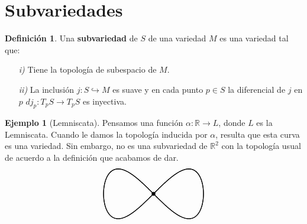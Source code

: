 \documentclass[spanish]{book}
\theoremstyle{definition}
\newtheorem*{defn}{Definición}
\newtheorem*{ejem}{Ejemplo}
\newcommand{\R}{\mathbb{R}}
\begin{document}
\section{Subvariedades}
\begin{defn}
	Una \textbf{subvariedad} de $S$ de una variedad $M$ es una variedad tal que:
	\begin{enumerate}
		\item[\textit{i)}] Tiene la topología de subespacio de $M$.
		\item[\textit{ii)}] La inclusión $j:S\hookrightarrow M$ es suave y en cada punto $p\in S$ la diferencial de $j$ en $p$ $dj_p:T_pS\to T_pS$ es inyectiva.
	\end{enumerate}
\end{defn}
\begin{ejem}[Lemniscata]
	Pensamos una función $\alpha:\R\to L$, donde $L$ es la Lemniscata. Cuando le damos la topología inducida por $\alpha$, resulta que esta curva es una variedad. Sin embargo, no es una subvariedad de $\R^2$ con la topología usual de acuerdo a la definición que acabamos de dar.
	\[\begin{tikzpicture}[scale=1.5]
		
		\draw[thick, domain=0:360, samples=500] plot ({sqrt(2) * cos(\x)} , {sqrt(2) * cos(\x) * sin(\x)});
		\draw[thick, domain=0:360, samples=500] plot ({-sqrt(2) * cos(\x)} , {-sqrt(2) * cos(\x) * sin(\x)});
		
		\draw[fill=black] (0,0) circle (0.05);
	\end{tikzpicture}\]
\end{ejem}
\end{document}
